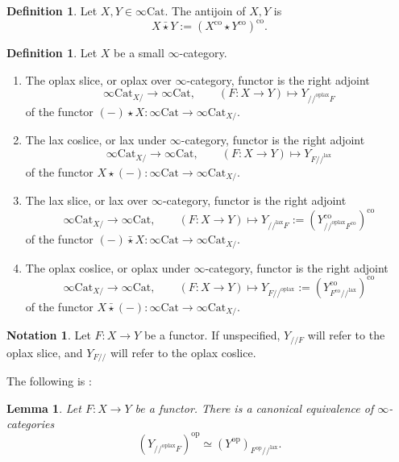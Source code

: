 \documentclass[10pt,oneside]{article}
\numberwithin{equation}{section} %
\numberwithin{figure}{section} %
\theoremstyle{plain}
\newtheorem{lemma}[theorem]{Lemma}
\theoremstyle{definition}
\newtheorem{definition}[theorem]{Definition}
\newtheorem{notation}[theorem]{Notation}
\newcommand{\X}{X}
\newcommand{\op}{\mathrm{op}}
\newcommand{\co}{\mathrm{co}}
\newcommand{\Cat}{\mathrm{Cat}}
\newcommand{\lax}{{\mathrm{lax}}}
\newcommand{\oplax}{{\mathrm{oplax}}}
\begin{document}
\begin{definition}
Let $X, Y \in \infty\Cat.$ The antijoin of $X, Y$ is
$$X \bar{\star} Y := (X^{\co} \star Y^{\co})^{\co} .$$

\end{definition}

\begin{definition}Let $X$ be a small $\infty$-category.
\begin{enumerate}[\normalfont(1)]\setlength{\itemsep}{-2pt}
\item The oplax slice, or oplax over $\infty$-category, functor is the right adjoint $$ \infty\Cat_{X/ } \to \infty\Cat, \qquad (F:X \to Y) \mapsto Y_{//^\oplax F}$$ of the functor $ (-) \star X: \infty\Cat \to \infty\Cat_{X/ }.$

\item The lax coslice, or lax under $\infty$-category, functor is the right adjoint $$ \infty\Cat_{X/ } \to \infty\Cat,\qquad (F:X \to Y) \mapsto Y_{F//^\lax }$$ of the functor $ X \star (-): \infty\Cat \to \infty\Cat_{\X / }.$

\item The lax slice, or lax over $\infty$-category, functor is the right adjoint $$ \infty\Cat_{\X / } \to \infty\Cat,\qquad (F:X \to Y) \mapsto Y_{//^\lax F} := (Y^\co_{//^\oplax F^\co})^\co $$
of the functor $ (-) \bar{\star} X: \infty\Cat \to \infty\Cat_{X/ }.$

\item The oplax coslice, or oplax under $\infty$-category, functor is the right adjoint $$ \infty\Cat_{X/ } \to \infty\Cat,\qquad (F:X \to Y) \mapsto Y_{F//^\oplax}:=(Y^\co_{F^\co//^\lax })^\co $$
of the functor $ X \bar{\star} (-): \infty\Cat \to \infty\Cat_{\X / }.$

\end{enumerate}

\end{definition}

\begin{notation}Let $F: X \to Y $ be a functor.
If unspecified, $Y_{//F}$ will refer to the oplax slice, and $Y_{F//}$ will refer to the oplax coslice.
\end{notation}

The following is \cite[Lemma 3.7.13.]{GepnerHeine2026}:

\begin{lemma}Let $F: X \to Y $ be a functor.
There is a canonical equivalence of $\infty$-categories
$$ (Y_{//^\oplax F})^\op \simeq (Y^\op)_{F^\op//^\lax }.$$
\end{lemma}
\end{document}
